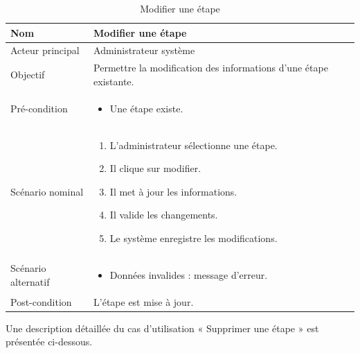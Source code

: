 \begin{table}[H]
\centering
\begin{tabular}{ |p{4cm}|p{12cm}|} \hline

Nom & Modifier une étape \\ \hline

Acteur principal & Administrateur système \\ \hline

Objectif & Permettre la modification des informations d’une étape existante. \\ \hline

Pré-condition &
\begin{itemize}
    \item Une étape existe.
\end{itemize}
\\ \hline

Scénario nominal &
\begin{enumerate}
    \item L’administrateur sélectionne une étape.
    \item Il clique sur modifier.
    \item Il met à jour les informations.
    \item Il valide les changements.
    \item Le système enregistre les modifications.
\end{enumerate}
\\ \hline

Scénario alternatif &
\begin{itemize}
    \item Données invalides : message d’erreur.
\end{itemize}
\\ \hline

Post-condition &
L’étape est mise à jour. \\ \hline

\end{tabular}
\caption{Modifier une étape}
\end{table}


Une description détaillée du cas d’utilisation « Supprimer une étape » est présentée ci-dessous.

